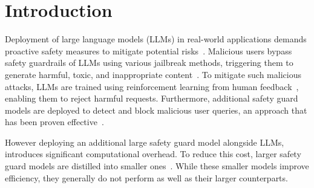 \section{Introduction}
Deployment of large language models (LLMs) in real-world applications demands proactive safety measures to mitigate potential risks~\citep{tay-chatbot, llm-risk}. Malicious users bypass safety guardrails of LLMs using various jailbreak methods, triggering them to generate harmful, toxic, and inappropriate content~\citep{zou2023universal, autodan, yuan2024cipherchat}. To mitigate such malicious attacks, LLMs are trained using reinforcement learning from human feedback~\citep[RLHF;][]{rlhf}, enabling them to reject harmful requests. Furthermore, additional safety guard models are deployed to detect and block malicious user queries, an approach that has been proven effective~\citep{chao2024jailbreakbench}.

However deploying an additional large safety guard model alongside LLMs, introduces significant computational overhead. To reduce this cost, larger safety guard models are distilled into smaller ones~\citep{metallamaguard3, harmaug}. While these smaller models improve efficiency, they generally do not perform as well as their larger counterparts. 


\begin{table}[t]
\centering
    \vspace{-0.5em}
    \caption{
    An example from the WildGuardMix dataset, where the smaller model, \texttt{Llama-Guard-3-1B} incorrectly assesses the prompt-response pair, while the larger model, \texttt{Llama-Guard-3-8B}, correctly predicts harmfulness. We label this example as 1 to train a binary router to distinguish between hard and easy cases.}
\label{tab:example}
\vspace{-0.2em}
\end{table}


